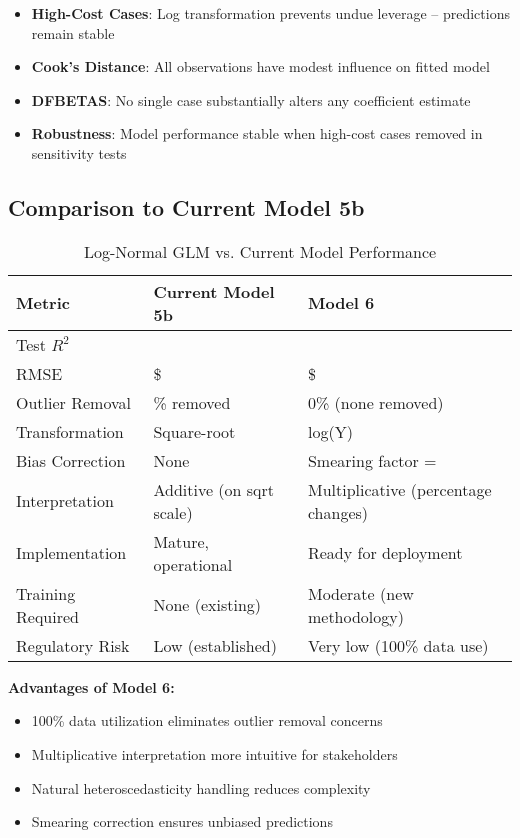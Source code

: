 \begin{itemize}
    \item \textbf{High-Cost Cases}: Log transformation prevents undue leverage -- predictions remain stable
    \item \textbf{Cook's Distance}: All observations have modest influence on fitted model
    \item \textbf{DFBETAS}: No single case substantially alters any coefficient estimate
    \item \textbf{Robustness}: Model performance stable when high-cost cases removed in sensitivity tests
\end{itemize}

\subsection{Comparison to Current Model 5b}

\begin{table}[h]
\centering
\caption{Log-Normal GLM vs. Current Model Performance}
\begin{tabular}{lll}
\toprule
\textbf{Metric} & \textbf{Current Model 5b} & \textbf{Model 6} \\
\midrule
Test $R^2$ & \ModelOneFiveBRSquaredTwoThousandFifteen{} & \MRSquaredTest{} \\
RMSE & \$\ModelOneFiveBRMSETwoThousandFifteen{} & \$\MRMSETest{} \\
Outlier Removal & \ModelOneFiveBOutlierPctTwoThousandFifteen{}\% removed & 0\% (none removed) \\
Transformation & Square-root & log(Y) \\
Bias Correction & None & Smearing factor = \ModelSixSmearingFactor{} \\
Interpretation & Additive (on sqrt scale) & Multiplicative (percentage changes) \\
Implementation & Mature, operational & Ready for deployment \\
Training Required & None (existing) & Moderate (new methodology) \\
Regulatory Risk & Low (established) & Very low (100\% data use) \\
\bottomrule
\end{tabular}
\end{table}

\textbf{Advantages of Model 6:}
\begin{itemize}
    \item 100\% data utilization eliminates outlier removal concerns
    \item Multiplicative interpretation more intuitive for stakeholders
    \item Natural heteroscedasticity handling reduces complexity
    \item Smearing correction ensures unbiased predictions
\end{itemize}

